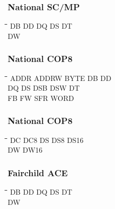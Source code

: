 \subsubsection{National SC/MP}
{\tt\begin{tabbing}
\hspace{3cm}\=\hspace{3cm}\=\hspace{3cm}\=\hspace{3cm}\=\kill
DB         \> DD          \> DQ          \> DS          \> DT \\
DW \\
\end{tabbing}}
	
\subsubsection{National COP8}
{\tt\begin{tabbing}
\hspace{3cm}\=\hspace{3cm}\=\hspace{3cm}\=\hspace{3cm}\=\kill
ADDR       \> ADDRW       \> BYTE        \> DB          \> DD \\
DQ         \> DS          \> DSB         \> DSW         \> DT \\
FB         \> FW          \> SFR         \> WORD \\
\end{tabbing}}

\subsubsection{National COP8}
{\tt\begin{tabbing}
\hspace{3cm}\=\hspace{3cm}\=\hspace{3cm}\=\hspace{3cm}\=\kill
DC         \> DC8         \> DS          \> DS8         \> DS16 \\
DW         \> DW16 \\
\end{tabbing}}


\subsubsection{Fairchild ACE}
{\tt\begin{tabbing}
\hspace{3cm}\=\hspace{3cm}\=\hspace{3cm}\=\hspace{3cm}\=\kill
DB          \> DD          \> DQ          \> DS         \> DT \\
DW \\
\end{tabbing}}

